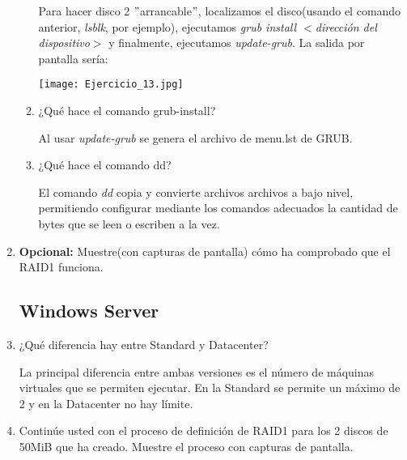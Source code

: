\documentclass[paper=a4, fontsize=11pt]{scrartcl} %
\numberwithin{equation}{section} %
\numberwithin{figure}{section} %
\numberwithin{table}{section} %
\begin{document}
\begin{enumerate}
\begin{enumerate}
			Para hacer disco 2 $"$arrancable$"$, localizamos el disco(usando el comando anterior,
			\textit{lsblk}, por ejemplo), ejecutamos \textit{grub install $<$dirección del dispositivo$>$}
			y finalmente, ejecutamos \textit{update-grub}. La salida por pantalla sería:
			
			\texttt{[image: Ejercicio\_13.jpg]}
			
			\item ¿Qué hace el comando grub-install?
			
			Al usar \textit{update-grub} se genera el archivo de menu.lst de GRUB\cite{man_update-grub}.
			
			\item ¿Qué hace el comando dd?
			
			El comando \textit{dd} copia y convierte archivos archivos a bajo nivel, permitiendo configurar
			mediante los comandos adecuados la cantidad de bytes que se leen o escriben a la vez\cite{man_dd}.
			
		\end{enumerate}
		
		\item \textbf{Opcional:} Muestre(con capturas de pantalla) cómo ha comprobado que el RAID1
		funciona.
		
	\subsection{Windows Server}
		\item ¿Qué diferencia hay entre Standard y Datacenter?
		
		La principal diferencia entre ambas versiones es el número de máquinas virtuales que se
		permiten ejecutar. En la Standard se permite un máximo de 2 y en la Datacenter no hay
		límite.\cite{W12_v}
		
		\item Continúe usted con el proceso de definición de RAID1 para los 2 discos de 50MiB que
		ha creado. Muestre el proceso con capturas de pantalla.
		

\end{enumerate}
\end{document}
